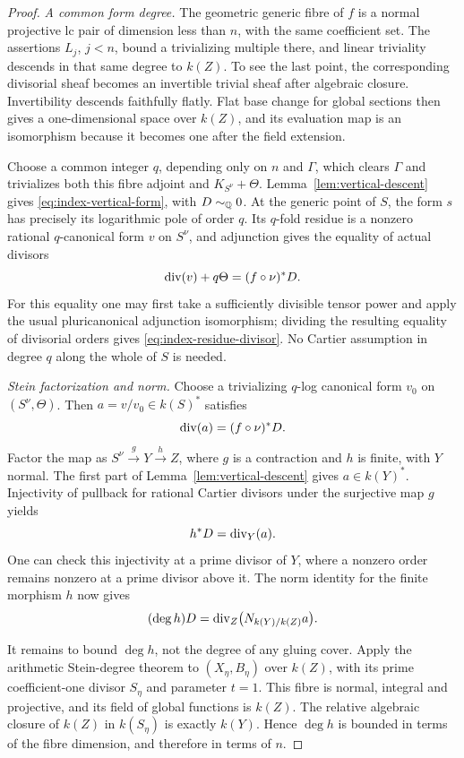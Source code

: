 \begin{proof}
\emph{A common form degree.}
The geometric generic fibre of $f$ is a normal projective lc pair
of dimension less than $n$, with the same coefficient set. The
assertions $L_j$, $j<n$, bound a trivializing multiple there, and
linear triviality descends in that same degree to $k(Z)$. To see the
last point, the corresponding divisorial sheaf becomes an invertible
trivial sheaf after algebraic closure. Invertibility descends
faithfully flatly. Flat base change for global sections then gives
a one-dimensional space over $k(Z)$, and its evaluation map is an
isomorphism because it becomes one after the field extension.

Choose a common integer $q$, depending only on $n$ and $\Gamma$,
which clears $\Gamma$ and trivializes both this fibre adjoint and
$K_{S^\nu}+\Theta$. Lemma~\ref{lem:vertical-descent} gives
\eqref{eq:index-vertical-form}, with $D\sim_{\mathbb Q}0$. At the generic
point of $S$, the form $s$ has precisely its logarithmic pole of
order $q$. Its $q$-fold residue is a nonzero rational
$q$-canonical form $v$ on $S^\nu$, and adjunction gives the equality
of actual divisors
\begin{equation}\label{eq:index-residue-divisor}
       \operatorname{div}(v)+q\Theta=(f\circ\nu)^*D.
\end{equation}
For this equality one may first take a sufficiently divisible
tensor power and apply the usual pluricanonical adjunction
isomorphism; dividing the resulting equality of divisorial orders
gives \eqref{eq:index-residue-divisor}. No Cartier assumption in
degree $q$ along the whole of $S$ is needed.

\emph{Stein factorization and norm.}
Choose a trivializing $q$-log canonical form $v_0$ on
$(S^\nu,\Theta)$. Then $a=v/v_0\in k(S)^*$ satisfies
\[
                     \operatorname{div}(a)=(f\circ\nu)^*D.
\]
Factor the map as $S^\nu\xrightarrow{g}Y\xrightarrow{h}Z$, where
$g$ is a contraction and $h$ is finite, with $Y$ normal. The first
part of Lemma~\ref{lem:vertical-descent} gives $a\in k(Y)^*$.
Injectivity of pullback for rational Cartier divisors under the
surjective map $g$ yields
\[
                          h^*D=\operatorname{div}_Y(a).
\]
One can check this injectivity at a prime divisor of $Y$, where a
nonzero order remains nonzero at a prime divisor above it. The norm
identity for the finite morphism $h$ now gives
\begin{equation}\label{eq:index-norm}
       (\deg h)D=\operatorname{div}_Z\bigl(N_{k(Y)/k(Z)}a\bigr).
\end{equation}

It remains to bound $\deg h$, not the degree of any gluing cover.
Apply the arithmetic Stein-degree theorem \cite[Theorem~1.1]{SD}
to $(X_\eta,B_\eta)$ over $k(Z)$, with its prime coefficient-one
divisor $S_\eta$ and parameter $t=1$. This fibre is normal,
integral and projective, and its field of global functions is
$k(Z)$. The relative algebraic closure of $k(Z)$ in $k(S_\eta)$
is exactly $k(Y)$. Hence $\deg h$ is bounded in terms of the fibre
dimension, and therefore in terms of $n$.


\end{proof}
